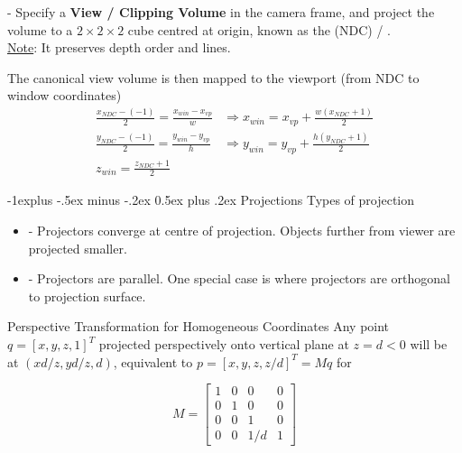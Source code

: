 \documentclass[10pt,landscape,letterpaper]{article}
\makeatletter
\renewcommand{\subsection}{\@startsection{subsection}{2}{0mm}%
                                {-1explus -.5ex minus -.2ex}%
                                {0.5ex plus .2ex}%
                                {\sffamily\normalsize\itshape}}
\makeatother
\begin{document}
\begin{multicols}{3}
\smallskip

 - Specify a \textbf{View / Clipping Volume} in the camera frame, and project the volume to a $2 \times 2 \times 2$ cube centred at origin, known as the  (NDC) / .
\\
\underline{Note}: It preserves depth order and lines.

\smallskip

The canonical view volume is then mapped to the viewport (from NDC to window coordinates)
\\
\begin{align*}
\frac{x_{NDC}-(-1)}{2}=\frac{x_{win}-x_{vp}}{w}
&\Rightarrow
x_{win}=x_{vp}+\frac{w(x_{NDC}+1)}{2}
\\
\frac{y_{NDC}-(-1)}{2}=\frac{y_{win}-y_{vp}}{h}
&\Rightarrow
y_{win}=y_{vp}+\frac{h(y_{NDC}+1)}{2}
\\
z_{win}=\frac{z_{NDC}+1}{2}
\end{align*}

\subsection{Projections}
Types of projection
\begin{itemize}
    \item {} - Projectors converge at centre of projection. Objects further from viewer are projected smaller.
    \item {} - Projectors are parallel. One special case  is where projectors are orthogonal to projection surface.
\end{itemize}

Perspective Transformation for Homogeneous Coordinates
Any point $q = [x, y, z, 1]^T$ projected perspectively onto vertical plane at $z = d < 0$ will be at $(xd/z, yd/z, d)$, equivalent to $p = [x, y, z, z/d]^T = Mq$ for

\[
M = 
\begin{bmatrix}
1       & 0         &  0        & 0       \\
0       & 1         &  0        & 0       \\
0       & 0         &  1        & 0       \\
0       & 0         &  1/d      & 1
\end{bmatrix}
\]


\end{multicols}
\end{document}
